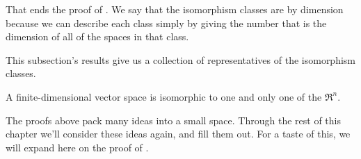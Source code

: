That ends the proof of .
We say that the isomorphism classes are 
%
by dimension because we can
describe each class simply by giving the number that is the dimension of
all of the spaces in that class.

This subsection's results give us a collection of 
representatives of the isomorphism 
classes. %
 
\begin{corollary}
A finite-dimensional vector space is isomorphic to one and only one
of the $\Re^n$.
\end{corollary}

The proofs above pack many ideas into a small space.
Through the rest of this chapter
we'll consider these ideas again, and fill them out.
For a taste of this, we will expand here 
on the proof of .

